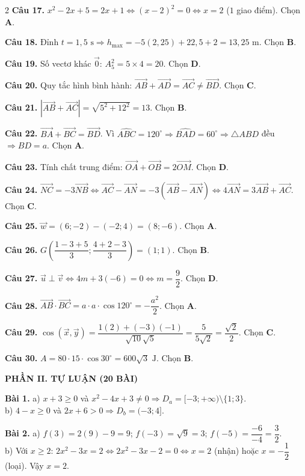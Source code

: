 \documentclass[12pt,a4paper]{article}
\begin{document}
\begin{multicols}{2}
\textbf{Câu 17.} $x^2 - 2x + 5 = 2x + 1 \Leftrightarrow (x - 2)^2 = 0 \Leftrightarrow x = 2$ ($1$ giao điểm). Chọn \textbf{A}.

\textbf{Câu 18.} Đỉnh $t = 1{,}5\text{ s} \Rightarrow h_{\max} = -5(2{,}25) + 22{,}5 + 2 = 13{,}25\text{ m}$. Chọn \textbf{B}.

\textbf{Câu 19.} Số vectơ khác $\vec{0}$: $A_5^2 = 5 \times 4 = 20$. Chọn \textbf{D}.

\textbf{Câu 20.} Quy tắc hình bình hành: $\vec{AB} + \vec{AD} = \vec{AC} \ne \vec{BD}$. Chọn \textbf{C}.

\textbf{Câu 21.} $|\vec{AB} + \vec{AC}| = \sqrt{5^2 + 12^2} = 13$. Chọn \textbf{B}.

\textbf{Câu 22.} $\vec{BA} + \vec{BC} = \vec{BD}$. Vì $\widehat{ABC} = 120^\circ \Rightarrow \widehat{BAD} = 60^\circ \Rightarrow \triangle ABD$ đều $\Rightarrow BD = a$. Chọn \textbf{A}.

\textbf{Câu 23.} Tính chất trung điểm: $\vec{OA} + \vec{OB} = 2\vec{OM}$. Chọn \textbf{D}.

\textbf{Câu 24.} $\vec{NC} = -3\vec{NB} \Leftrightarrow \vec{AC} - \vec{AN} = -3(\vec{AB} - \vec{AN}) \Leftrightarrow 4\vec{AN} = 3\vec{AB} + \vec{AC}$. Chọn \textbf{C}.

\textbf{Câu 25.} $\vec{w} = (6; -2) - (-2; 4) = (8; -6)$. Chọn \textbf{A}.

\textbf{Câu 26.} $G\left(\dfrac{1-3+5}{3}; \dfrac{4+2-3}{3}\right) = (1; 1)$. Chọn \textbf{B}.

\textbf{Câu 27.} $\vec{u} \perp \vec{v} \Leftrightarrow 4m + 3(-6) = 0 \Leftrightarrow m = \dfrac{9}{2}$. Chọn \textbf{D}.

\textbf{Câu 28.} $\vec{AB} \cdot \vec{BC} = a \cdot a \cdot \cos 120^\circ = -\dfrac{a^2}{2}$. Chọn \textbf{A}.

\textbf{Câu 29.} $\cos(\vec{x}, \vec{y}) = \dfrac{1(2) + (-3)(-1)}{\sqrt{10}\sqrt{5}} = \dfrac{5}{5\sqrt{2}} = \dfrac{\sqrt{2}}{2}$. Chọn \textbf{C}.

\textbf{Câu 30.} $A = 80 \cdot 15 \cdot \cos 30^\circ = 600\sqrt{3}\text{ J}$. Chọn \textbf{B}.

\columnbreak

\textbf{\color{accent}PHẦN II. TỰ LUẬN (20 BÀI)}

\textbf{Bài 1.} a) $x + 3 \ge 0$ và $x^2 - 4x + 3 \ne 0 \Rightarrow D_a = [-3; +\infty) \setminus \{1; 3\}$.\\
b) $4 - x \ge 0$ và $2x + 6 > 0 \Rightarrow D_b = (-3; 4]$.

\textbf{Bài 2.} a) $f(3) = 2(9) - 9 = 9$; $f(-3) = \sqrt{9} = 3$; $f(-5) = \dfrac{-6}{-4} = \dfrac{3}{2}$.\\
b) Với $x \ge 2$: $2x^2 - 3x = 2 \Leftrightarrow 2x^2 - 3x - 2 = 0 \Leftrightarrow x = 2$ (nhận) hoặc $x = -\dfrac{1}{2}$ (loại). Vậy $x = 2$.


\end{multicols}
\end{document}
